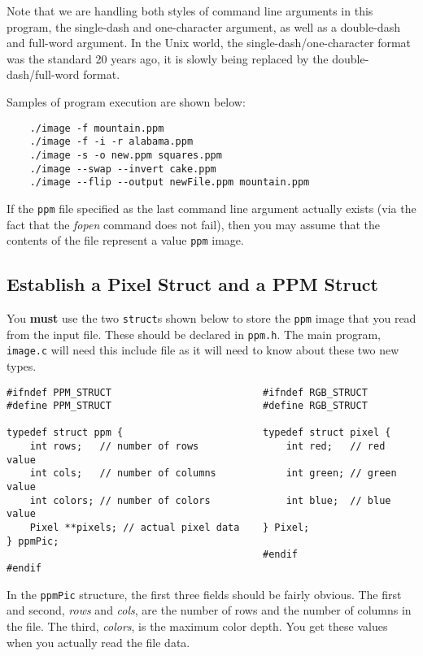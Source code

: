 \documentclass[12pt]{article}
\begin{document}
Note that we are handling both styles of command line arguments
in this program, the single-dash and one-character argument, as
well as a double-dash and full-word argument.  In the Unix
world, the single-dash/one-character format was the standard
20 years ago, it is slowly being replaced by the double-dash/full-word
format.

Samples of program execution are shown below:

\begin{verbatim}
    ./image -f mountain.ppm
    ./image -f -i -r alabama.ppm
    ./image -s -o new.ppm squares.ppm
    ./image --swap --invert cake.ppm
    ./image --flip --output newFile.ppm mountain.ppm
\end{verbatim}

If the {\tt ppm} file specified as the
last command line argument actually exists (via the fact that
the {\it fopen} command does not fail), then you may assume that the
contents of the file represent a value {\tt ppm} image.

\subsection*{Establish a Pixel Struct and a PPM Struct}

You {\bf must} use the two {\tt struct}s shown below 
to store the {\tt ppm} image that you read from the input file.
These should be declared in {\tt ppm.h}.  The main program, 
{\tt image.c} will need this include file as it will need to know
about these two new types.

\begin{verbatim}
#ifndef PPM_STRUCT                          #ifndef RGB_STRUCT
#define PPM_STRUCT                          #define RGB_STRUCT

typedef struct ppm {                        typedef struct pixel {
    int rows;   // number of rows               int red;   // red value
    int cols;   // number of columns            int green; // green value
    int colors; // number of colors             int blue;  // blue value
    Pixel **pixels; // actual pixel data    } Pixel;
} ppmPic;
                                            #endif
#endif
\end{verbatim}

In the {\tt ppmPic} structure, the first three fields
should be fairly obvious.  The first and second, {\it rows} and
{\it cols}, are the number of rows and the number of columns in the file.
The third, {\it colors}, is the maximum color depth.
You get these values when you actually read the file data.
\end{document}
